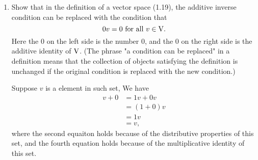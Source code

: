 \begin{enumerate}
\begin{solution}
        \end{solution}
    \item Show that in the definition of a vector space (1.19), the additive inverse condition can be 
        replaced with the condition that 
        \[ 0v = 0 \text{ for all } v \in \mathrm{V}.\]
        Here the $0$ on the left side is the number $0$, and the $0$ on the right side is the additive identity 
        of $\mathrm{V}$. (The phrase "a condition can be replaced" in a definition means that the collection of 
        objects satisfying the definition is unchanged if the original condition is replaced with the 
        new condition.)
        \begin{solution}
            Suppose $v$ is a element in such set, We have 
            \begin{align*}
                v + 0 &= 1v + 0v \\
                      &= (1+0)v \\
                      &= 1v \\
                      &= v,
            \end{align*}
            where the second equaiton holds because of the distributive properties of this set, and the fourth equation holds 
            because of the multiplicative identity of this set. 
            

\end{solution}
\end{enumerate}
